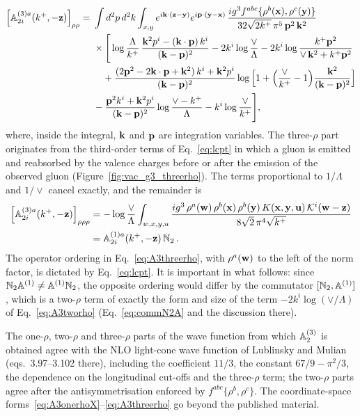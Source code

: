 \begin{align}\label{eq:A3tworho}
\Big[\mathbb{A}^{(3)a}_{2i}(k^+,-\mathbf{z})\Big]_{\rho\rho}=\ &\int d^2p\,d^2k\int_{x,y}e^{i\mathbf{k}\cdot(\mathbf{z}-\mathbf{y})}e^{i\mathbf{p}\cdot(\mathbf{y}-\mathbf{x})}\,\frac{ig^3f^{abc}\{\rho^b(\mathbf{x}),\rho^c(\mathbf{y})\}}{32\sqrt{2k^+}\,\pi^5\,\mathbf{p}^2\,\mathbf{k}^2}
\notag\\&\times\Bigg[\log\frac{\Lambda}{k^+}\,\frac{\mathbf{k}^2p^i-(\mathbf{k}\cdot\mathbf{p})\,k^i}{(\mathbf{k}-\mathbf{p})^2}
-2k^i\log\frac{\vee}{\Lambda}
-2k^i\log\frac{k^+\mathbf{p}^2}{\vee\,\mathbf{k}^2+k^+\mathbf{p}^2}
\notag\\&\quad
+\frac{(2\mathbf{p}^2-2\mathbf{k}\cdot\mathbf{p}+\mathbf{k}^2)\,k^i+\mathbf{k}^2p^i}{(\mathbf{k}-\mathbf{p})^2}\log\Big[1+\Big(\frac{\vee}{k^+}-1\Big)\frac{\mathbf{k}^2}{(\mathbf{k}-\mathbf{p})^2}\Big]
\notag\\&
-\frac{\mathbf{p}^2k^i+\mathbf{k}^2p^i}{(\mathbf{k}-\mathbf{p})^2}\log\frac{\vee-k^+}{\Lambda}-k^i\log\frac{\vee}{k^+}\Bigg],
\end{align}
where, inside the integral, $\mathbf{k}$ and $\mathbf{p}$ are integration variables. The three-$\rho$ part originates from the third-order terms of Eq.~\eqref{eq:lcpt} in which a gluon is emitted and reabsorbed by the valence charges before or after the emission of the observed gluon (Figure~\ref{fig:vac_g3_threerho}). The terms proportional to $1/\Lambda$ and $1/\vee$ cancel exactly, and the remainder is
\begin{align}\label{eq:A3threerho}
\Big[\mathbb{A}^{(3)a}_{2i}(k^+,-\mathbf{z})\Big]_{\rho\rho\rho}&=-\log\frac{\vee}{\Lambda}\int_{w,x,y,u}\frac{ig^3\,\rho^a(\mathbf{w})\,\rho^b(\mathbf{x})\,\rho^b(\mathbf{y})\,K(\mathbf{x},\mathbf{y},\mathbf{u})\,\mathcal{K}^i(\mathbf{w}-\mathbf{z})}{8\sqrt2\,\pi^4\sqrt{k^+}}
\notag\\&=\mathbb{A}^{(1)a}_{2i}(k^+,-\mathbf{z})\,\mathbb{N}_2\,.
\end{align}
The operator ordering in Eq.~\eqref{eq:A3threerho}, with $\rho^a(\mathbf{w})$ to the left of the norm factor, is dictated by Eq.~\eqref{eq:lcpt}. It is important in what follows: since $\mathbb{N}_2\mathbb{A}^{(1)}\neq\mathbb{A}^{(1)}\mathbb{N}_2$, the opposite ordering would differ by the commutator $[\mathbb{N}_2,\mathbb{A}^{(1)}]$, which is a two-$\rho$ term of exactly the form and size of the term $-2k^i\log(\vee/\Lambda)$ of Eq.~\eqref{eq:A3tworho} (Eq.~\eqref{eq:commN2A} and the discussion there).

The one-$\rho$, two-$\rho$ and three-$\rho$ parts of the wave function from which $\mathbb{A}^{(3)}_2$ is obtained agree with the NLO light-cone wave function of Lublinsky and Mulian~\cite{Lublinsky:2016meo} (eqs.~3.97--3.102 there), including the coefficient $11/3$, the constant $67/9-\pi^2/3$, the dependence on the longitudinal cut-offs and the three-$\rho$ term; the two-$\rho$ parts agree after the antisymmetrisation enforced by $f^{abc}\{\rho^b,\rho^c\}$. The coordinate-space forms~\eqref{eq:A3onerhoX}--\eqref{eq:A3threerho} go beyond the published material.

